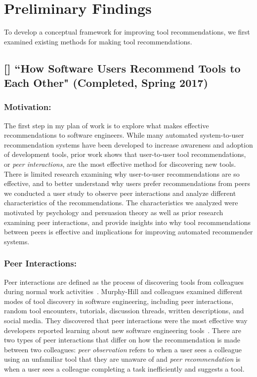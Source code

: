 \section{Preliminary Findings}
 
To develop a conceptual framework for improving tool recommendations, we first examined existing methods for making tool recommendations.

\subsection{[\peerT] ``How Software Users Recommend Tools to Each Other" (Completed, Spring 2017)}

\subsubsection{Motivation:}


The first step in my plan of work is to explore what makes effective recommendations to software engineers. While many automated system-to-user recommendation systems have been developed to increase awareness and adoption of development tools, prior work shows that user-to-user tool recommendations, or \textit{peer interactions}, are the most effective method for discovering new tools. There is limited research examining why user-to-user recommendations are so effective, and to better understand why users prefer recommendations from peers we conducted a user study to observe peer interactions and analyze different characteristics of the recommendations. The characteristics we analyzed were motivated by psychology and persuasion theory as well as prior research examining peer interactions, and provide insights into why tool recommendations between peers is effective and implications for improving automated recommender systems.

\subsubsection{Peer Interactions:}

Peer interactions are defined as the process of discovering tools from colleagues during normal work activities~\cite{Murphy-Hill2011PeerInteraction}. Murphy-Hill and colleagues examined different modes of tool discovery in software engineering, including peer interactions, random tool encounters, tutorials, discussion threads, written descriptions, and social media. They discovered that peer interactions were the most effective way developers reported learning about new software engineering tools~\cite{Murphy-Hill2015HowDoUsers,Murphy-Hill2011PeerInteraction}. There are two types of peer interactions that differ on how the recommendation is made between two colleagues: \textit{peer observation} refers to when a user sees a colleague using an unfamiliar tool that they are unaware of and \textit{peer recommendation} is when a user sees a colleague completing a task inefficiently and suggests a tool.

